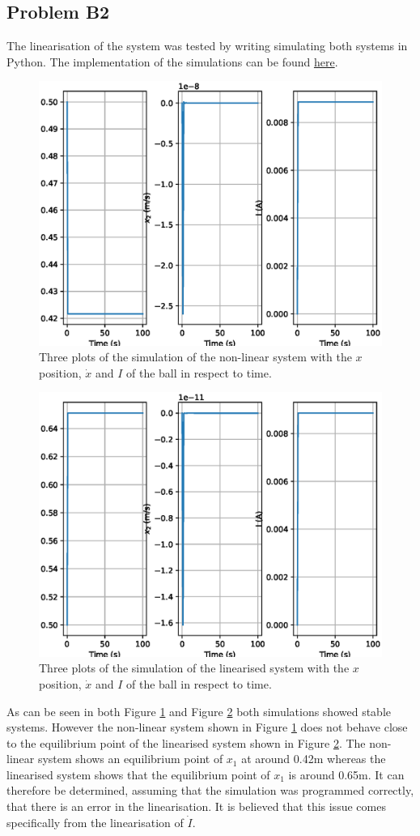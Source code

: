 \subsection*{Problem B2}
    \hfill \break
    The linearisation of the system was tested by writing simulating both systems in Python. The implementation of the simulations can be found \href{https://github.com/drlim2u/ELE2024-Control-Coursework/blob/4dc7e6f918fce68ee3aef799fe1dba15ea789481/PartB.py#L44}{here}.

    \begin{figure}[H]
        \centering
        \includegraphics[width=0.6\linewidth]{figures/problem_b2_a.eps}
        \caption{Three plots of the simulation of the non-linear system with the \(x\) position, \(\dot{x}\) and \(I\) of the ball in respect to time.}
        \label{fig:problem_b2_a}
    \end{figure}
    
    \begin{figure}[H]
        \centering
        \includegraphics[width=0.6\linewidth]{figures/problem_b2_b.eps}
        \caption{Three plots of the simulation of the linearised system with the \(x\) position, \(\dot{x}\) and \(I\) of the ball in respect to time.}
        \label{fig:problem_b2_b}
    \end{figure}
    
    As can be seen in both Figure \ref{fig:problem_b2_a} and Figure \ref{fig:problem_b2_b} both simulations showed stable systems. However the non-linear system shown in Figure \ref{fig:problem_b2_a} does not behave close to the equilibrium point of the linearised system shown in Figure \ref{fig:problem_b2_b}. The non-linear system shows an equilibrium point of \(x_1\) at around 0.42m whereas the linearised system shows that the equilibrium point of \(x_1\) is around 0.65m. It can therefore be determined, assuming that the simulation was programmed correctly, that there is an error in the linearisation. It is believed that this issue comes specifically from the linearisation of \(\dot{I}\).
